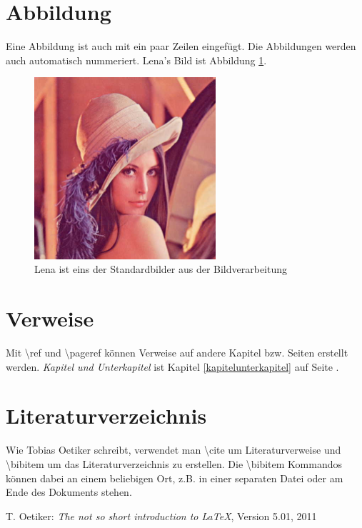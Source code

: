 \documentclass[a4paper,11pt]{report}
\begin{document}
\section{Abbildung}
Eine Abbildung ist auch mit ein paar Zeilen eingefügt. Die Abbildungen werden auch automatisch nummeriert. Lena's Bild ist Abbildung \ref{lena}.
\begin{figure}
\begin{center}
\includegraphics[width=0.6\textwidth]{lena.jpg}
\caption{Lena ist eins der Standardbilder aus der Bildverarbeitung}
\label{lena}
\end{center}
\end{figure}

\blindtext
\section{Verweise}
Mit \textbackslash ref und \textbackslash pageref können Verweise auf andere Kapitel bzw. Seiten erstellt werden. \emph{Kapitel und Unterkapitel} ist Kapitel \ref{kapitelunterkapitel} auf Seite \pageref{kapitelunterkapitel}.

\blindtext[2]

\section{Literaturverzeichnis}
Wie Tobias Oetiker \cite{lshort} schreibt, verwendet man \textbackslash cite um Literaturverweise und \textbackslash bibitem um das Literaturverzeichnis zu erstellen. Die \textbackslash bibitem Kommandos können dabei an einem beliebigen Ort, z.B. in einer separaten Datei oder am Ende des Dokuments stehen.

\begin{thebibliography}{99}
 T. Oetiker:
\emph{The not so short introduction to \LaTeX{}}, Version 5.01, 2011
\end{thebibliography}
\end{document}

